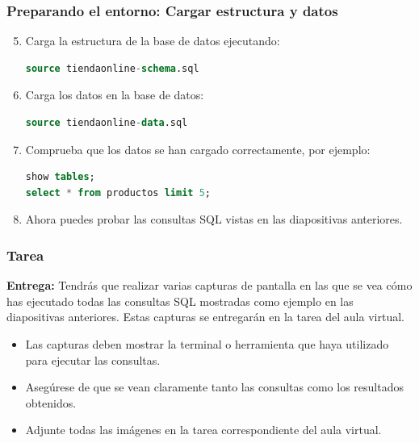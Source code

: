 \documentclass{beamer}
\begin{document}
\begin{frame}[fragile]
  \frametitle{Preparando el entorno: Cargar estructura y datos}

  \begin{enumerate}
    \setcounter{enumi}{4}
    \item Carga la estructura de la base de datos ejecutando:
    \begin{lstlisting}[language=SQL, backgroundcolor=\color{gray!10}]
source tiendaonline-schema.sql
    \end{lstlisting}
    \item Carga los datos en la base de datos:
    \begin{lstlisting}[language=SQL, backgroundcolor=\color{gray!10}]
source tiendaonline-data.sql
    \end{lstlisting}
    \item Comprueba que los datos se han cargado correctamente, por ejemplo:
    \begin{lstlisting}[language=SQL, backgroundcolor=\color{gray!10}]
show tables;
select * from productos limit 5;
    \end{lstlisting}
    \item Ahora puedes probar las consultas SQL vistas en las diapositivas anteriores.
  \end{enumerate}
\end{frame}


\begin{frame}
  \frametitle{Tarea}

  \textbf{Entrega:} Tendrás que realizar varias capturas de pantalla en las que se vea cómo has ejecutado todas las consultas SQL mostradas como ejemplo en las diapositivas anteriores. Estas capturas se entregarán en la tarea del aula virtual.\\[1em]
  \begin{itemize}
    \item Las capturas deben mostrar la terminal o herramienta que haya utilizado para ejecutar las consultas.
    \item Asegúrese de que se vean claramente tanto las consultas como los resultados obtenidos.
    \item Adjunte todas las imágenes en la tarea correspondiente del aula virtual.
  \end{itemize}

\end{frame}
\end{document}
